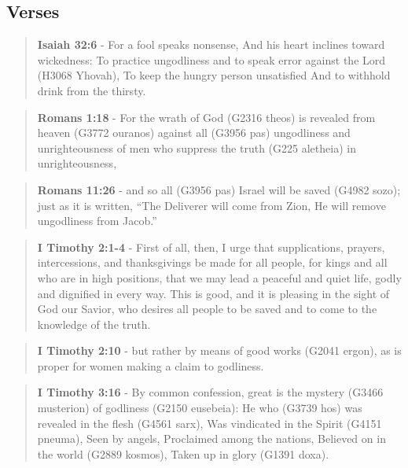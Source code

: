\documentclass[11pt]{article}
\begin{document}
\subsection{Verses}
\label{sec:orgebf2957}
\begin{quote}
\textbf{Isaiah 32:6} - For a fool speaks nonsense, And his heart inclines toward wickedness: To practice ungodliness and to speak error against the Lord (H3068 Yhovah), To keep the hungry person unsatisfied And to withhold drink from the thirsty.
\end{quote}

\begin{quote}
\textbf{Romans 1:18} - For the wrath of God (G2316 theos) is revealed from heaven (G3772 ouranos) against all (G3956 pas) ungodliness and unrighteousness of men who suppress the truth (G225 aletheia) in unrighteousness,
\end{quote}

\begin{quote}
\textbf{Romans 11:26} - and so all (G3956 pas) Israel will be saved (G4982 sozo); just as it is written, “The Deliverer will come from Zion, He will remove ungodliness from Jacob.”
\end{quote}

\begin{quote}
\textbf{I Timothy 2:1-4} - First of all, then, I urge that supplications, prayers, intercessions, and thanksgivings be made for all people, for kings and all who are in high positions, that we may lead a peaceful and quiet life, godly and dignified in every way. This is good, and it is pleasing in the sight of God our Savior, who desires all people to be saved and to come to the knowledge of the truth.
\end{quote}

\begin{quote}
\textbf{I Timothy 2:10} - but rather by means of good works (G2041 ergon), as is proper for women making a claim to godliness.
\end{quote}

\begin{quote}
\textbf{I Timothy 3:16} - By common confession, great is the mystery (G3466 musterion) of godliness (G2150 eusebeia): He who (G3739 hos) was revealed in the flesh (G4561 sarx), Was vindicated in the Spirit (G4151 pneuma), Seen by angels, Proclaimed among the nations, Believed on in the world (G2889 kosmos), Taken up in glory (G1391 doxa).
\end{quote}
\end{document}
